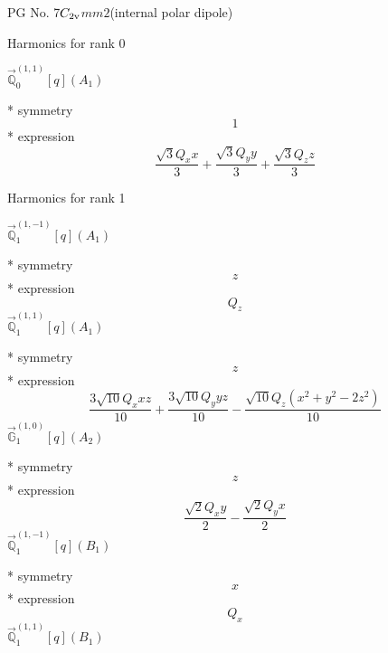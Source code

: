 \documentclass[fleqn,8pt]{jsarticle}
\begin{document}
\setcounter{MaxMatrixCols}{32}

\renewcommand{\tablename}{Table~}
\renewcommand{\figurename}{Figure~}
\begin{center}
\LARGE
PG No. 7\quad$C_{\rm 2v}$\quad$mm2$\quad[ orthorhombic ] (internal polar dipole)
\end{center}

\noindent * Harmonics for rank 0

\noindent\quad $\vec{\mathbb{Q}}_{0}^{(1,1)}[q](A_{1})$

\noindent\quad ** symmetry
\begin{dmath*}
1
\end{dmath*}
\noindent\quad ** expression
\begin{dmath*}
\frac{\sqrt{3} Q_{x} x}{3} + \frac{\sqrt{3} Q_{y} y}{3} + \frac{\sqrt{3} Q_{z} z}{3}
\end{dmath*}

\noindent * Harmonics for rank 1

\noindent\quad $\vec{\mathbb{Q}}_{1}^{(1,-1)}[q](A_{1})$

\noindent\quad ** symmetry
\begin{dmath*}
z
\end{dmath*}
\noindent\quad ** expression
\begin{dmath*}
Q_{z}
\end{dmath*}
\noindent\quad $\vec{\mathbb{Q}}_{1}^{(1,1)}[q](A_{1})$

\noindent\quad ** symmetry
\begin{dmath*}
z
\end{dmath*}
\noindent\quad ** expression
\begin{dmath*}
\frac{3 \sqrt{10} Q_{x} x z}{10} + \frac{3 \sqrt{10} Q_{y} y z}{10} - \frac{\sqrt{10} Q_{z} \left(x^{2} + y^{2} - 2 z^{2}\right)}{10}
\end{dmath*}
\noindent\quad $\vec{\mathbb{G}}_{1}^{(1,0)}[q](A_{2})$

\noindent\quad ** symmetry
\begin{dmath*}
z
\end{dmath*}
\noindent\quad ** expression
\begin{dmath*}
\frac{\sqrt{2} Q_{x} y}{2} - \frac{\sqrt{2} Q_{y} x}{2}
\end{dmath*}
\noindent\quad $\vec{\mathbb{Q}}_{1}^{(1,-1)}[q](B_{1})$

\noindent\quad ** symmetry
\begin{dmath*}
x
\end{dmath*}
\noindent\quad ** expression
\begin{dmath*}
Q_{x}
\end{dmath*}
\noindent\quad $\vec{\mathbb{Q}}_{1}^{(1,1)}[q](B_{1})$
\end{document}
